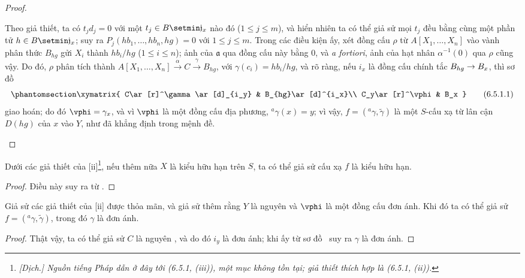 \documentclass[oneside]{amsart}
\makeatletter
\renewcommand{\leq}{\leqslant}
\newcommand{\ega@arrow}[2]{\mathchoice{#1}{#2}{#2}{#2}}
\renewcommand{\to}{\ega@arrow{\longrightarrow}{\rightarrow}}
\newcommand{\oldpage}[2][]{{\marginnote{\normalfont\textbf{#1}~|~#2}}\ignorespaces}
\let\EGAOriginalLabel\label
\renewcommand{\label}[1]{\phantomsection\EGAOriginalLabel{#1}}
\makeatother
\begin{document}
\begin{proof}
\begin{enumerate}
    Theo giả thiết, ta có $t_jd_j=0$ với một $t_j\in B\setmin\mathfrak{j}_x$ nào đó ($1\leq j\leq m$), và hiển nhiên ta có thể giả sử mọi $t_j$
\oldpage[I]{151}
    đều bằng cùng một phần tử $h\in B\setmin\mathfrak{j}_x$;
    suy ra $P_j(hb_1,\ldots,hb_n,hg)=0$ với $1\leq j\leq m$.
    Trong các điều kiện ấy, xét đồng cấu $\rho$ từ $A[X_1,\ldots,X_n]$ vào vành phân thức $B_{hg}$ gửi $X_i$ thành $hb_i/hg$ ($1\leq i\leq n$);
    ảnh của $\mathfrak{a}$ qua đồng cấu này bằng $0$, và \emph{a fortiori}, ảnh của hạt nhân $\alpha^{-1}(0)$ qua $\rho$ cũng vậy.
    Do đó, $\rho$ phân tích thành $A[X_1,\ldots,X_n]\xrightarrow{\alpha}C\xrightarrow{\gamma}B_{hg}$, với $\gamma(c_i)=hb_i/hg$, và rõ ràng, nếu $i_x$ là đồng cấu chính tắc $B_{hg}\to B_x$, thì sơ đồ
    \[
    \label{I.6.5.1.1}
      \xymatrix{
        C\ar[r]^\gamma\ar[d]_{i_y} &
        B_{hg}\ar[d]^{i_x}\\
        C_y\ar[r]^\vphi &
        B_x
      }
      \tag{6.5.1.1}
    \]
    giao hoán; do đó $\vphi=\gamma_x$, và vì $\vphi$ là một đồng cấu địa phương, $^a\gamma(x)=y$;
    vì vậy, $f=({}^a\gamma,\widetilde{\gamma})$ là một $S$-cấu xạ từ lân cận $D(hg)$ của $x$ vào $Y$, như đã khẳng định trong mệnh đề.
\end{enumerate}
\end{proof}

\begin{corollary}[6.5.2]
\label{I.6.5.2}
Dưới các giả thiết của [ii]\footnote{\emph{[Dịch.] Nguồn tiếng Pháp dẫn ở đây tới (6.5.1, (iii)), một mục không tồn tại; giả thiết thích hợp là (6.5.1, (ii)).}}, nếu thêm nữa $X$ là kiểu hữu hạn trên $S$, ta có thể giả sử cấu xạ $f$ là kiểu hữu hạn.
\end{corollary}

\begin{proof}
Điều này suy ra từ .
\end{proof}

\begin{corollary}[6.5.3]
\label{I.6.5.3}
Giả sử các giả thiết của [ii] được thỏa mãn, và giả sử thêm rằng $Y$ là nguyên và $\vphi$ là một đồng cấu đơn ánh.
Khi đó ta có thể giả sử $f=({}^a\gamma,\widetilde{\gamma})$, trong đó $\gamma$ là đơn ánh.
\end{corollary}

\begin{proof}
Thật vậy, ta có thể giả sử $C$ là nguyên , và do đó $i_y$ là đơn ánh; khi ấy từ sơ đồ~ suy ra $\gamma$ là đơn ánh.
\end{proof}
\end{document}
